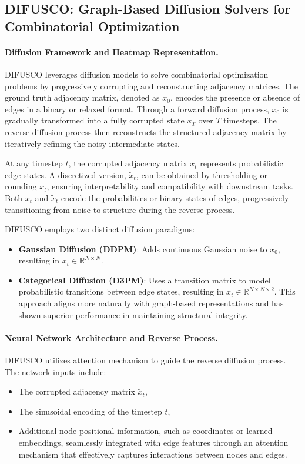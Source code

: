 \subsection{DIFUSCO: Graph-Based Diffusion Solvers for Combinatorial Optimization}

\paragraph{Diffusion Framework and Heatmap Representation.}  
DIFUSCO\cite{sun2023difusco} leverages diffusion models to solve combinatorial optimization problems by progressively corrupting and reconstructing adjacency matrices. The ground truth adjacency matrix, denoted as \(x_0\), encodes the presence or absence of edges in a binary or relaxed format. Through a forward diffusion process, \(x_0\) is gradually transformed into a fully corrupted state \(x_T\) over \(T\) timesteps. The reverse diffusion process then reconstructs the structured adjacency matrix by iteratively refining the noisy intermediate states.

At any timestep \(t\), the corrupted adjacency matrix \(x_t\) represents probabilistic edge states. A discretized version, \(\tilde{x}_t\), can be obtained by thresholding or rounding \(x_t\), ensuring interpretability and compatibility with downstream tasks. Both \(x_t\) and \(\tilde{x}_t\) encode the probabilities or binary states of edges, progressively transitioning from noise to structure during the reverse process.

DIFUSCO employs two distinct diffusion paradigms:
\begin{itemize}
    \item \textbf{Gaussian Diffusion (DDPM)}: Adds continuous Gaussian noise to \(x_0\), resulting in \(x_t \in \mathbb{R}^{N \times N}\).
    \item \textbf{Categorical Diffusion (D3PM)}: Uses a transition matrix to model probabilistic transitions between edge states, resulting in \(x_t \in \mathbb{R}^{N \times N \times 2}\). This approach aligns more naturally with graph-based representations and has shown superior performance in maintaining structural integrity.
\end{itemize}

\paragraph{Neural Network Architecture and Reverse Process.}  
DIFUSCO utilizes attention mechanism to guide the reverse diffusion process. The network inputs include:
\begin{itemize}
    \item The corrupted adjacency matrix \(\tilde{x}_t\),
    \item The sinusoidal encoding of the timestep \(t\),
    \item Additional node positional information, such as coordinates or learned embeddings, seamlessly integrated with edge features through an attention mechanism that effectively captures interactions between nodes and edges.
\end{itemize}

